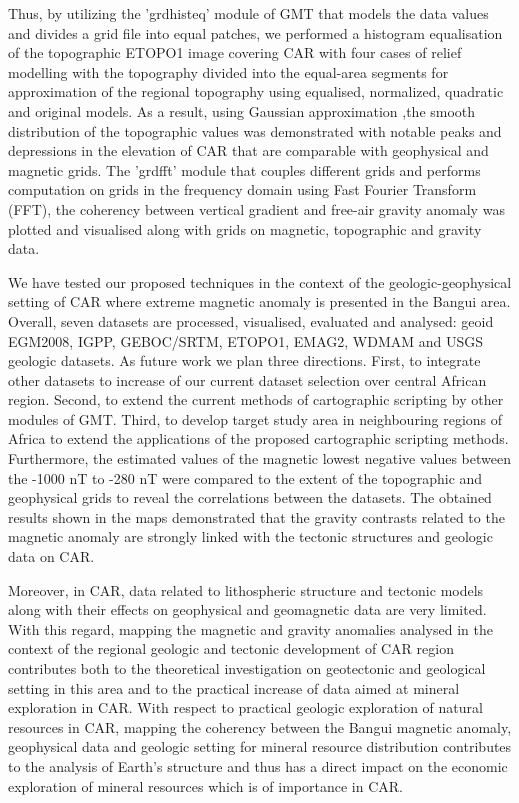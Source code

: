 \documentclass[minerals,article,submit,pdftex,moreauthors]{Definitions/mdpi}
\begin{document}
Thus, by utilizing the ’grdhisteq’ module of GMT that models the data values and divides a grid file into equal patches, we performed a histogram equalisation of the topographic ETOPO1 image covering CAR with four cases of relief modelling with the topography divided into the equal-area segments for approximation of the regional topography using equalised, normalized, quadratic and original models. As a result, using Gaussian approximation ,the smooth distribution of the topographic values was demonstrated with notable peaks and depressions in the elevation of CAR that are comparable with geophysical and magnetic grids. The  ’grdfft’ module that couples different grids and performs computation on grids in the frequency domain using Fast Fourier Transform (FFT), the coherency between vertical gradient and free-air gravity anomaly was plotted and visualised along with grids on magnetic, topographic and gravity data. 

We have tested our proposed techniques in the context of the geologic-geophysical setting of CAR where extreme magnetic anomaly is presented in the Bangui area. Overall, seven datasets are processed, visualised, evaluated and analysed: geoid EGM2008, IGPP, GEBOC/SRTM, ETOPO1, EMAG2, WDMAM and USGS geologic datasets. As future work we plan three directions. First, to integrate other datasets to increase of our current dataset selection over central African region. Second, to extend the current methods of cartographic scripting by other modules of GMT. Third, to develop target study area in neighbouring regions of Africa to extend the applications of the proposed cartographic scripting methods. Furthermore, the estimated values of the magnetic lowest negative values between the -1000 nT to -280 nT  were compared to the extent of the topographic and geophysical grids to reveal the correlations between the datasets. The obtained results shown in the maps demonstrated that the gravity contrasts related to the magnetic anomaly are strongly linked with the tectonic structures and geologic data on CAR. 

Moreover, in CAR, data related to lithospheric structure and tectonic models along with their effects on geophysical and geomagnetic data are very limited. With this regard, mapping the magnetic and gravity anomalies analysed in the context of the regional geologic and tectonic development of CAR region contributes both to the theoretical investigation on geotectonic and geological setting in this area and to the practical increase of data aimed at mineral exploration in CAR. With respect to practical geologic exploration of natural resources in CAR, mapping the coherency between the Bangui magnetic anomaly, geophysical data and geologic setting for mineral resource distribution contributes to the analysis of Earth's structure and thus has a direct impact on the economic exploration of mineral resources which is of importance in CAR.
\end{document}
